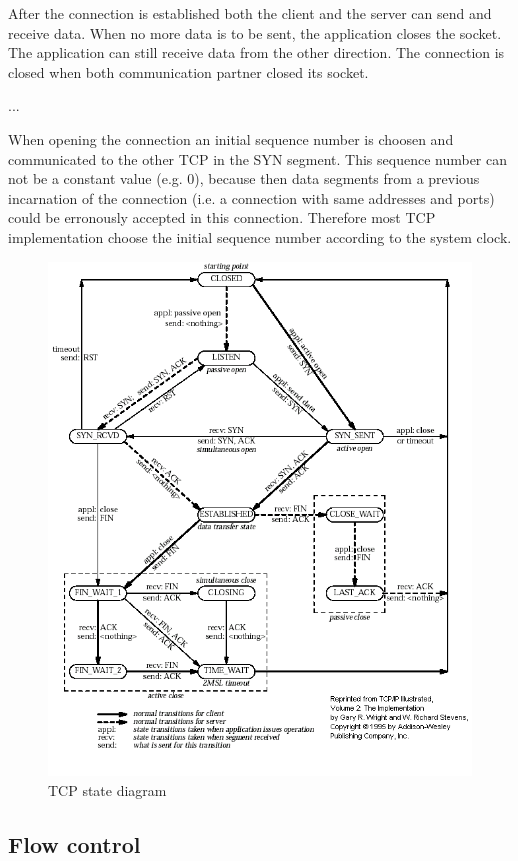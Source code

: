 After the connection is established both the client and the server can send and receive data.
When no more data is to be sent, the application closes the socket. The application can still
receive data from the other direction. The connection is closed when both communication partner
closed its socket.

...

When opening the connection an initial sequence number is choosen and communicated to the
other TCP in the SYN segment. This sequence number can not be a constant value (e.g. 0),
because then data segments from a previous incarnation of the connection (i.e. a connection
with same addresses and ports) could be erronously accepted in this connection. Therefore
most TCP implementation choose the initial sequence number according to the system clock.


\begin{figure}
\includegraphics[width=\textwidth]{figures/tcpstate}
\caption{TCP state diagram}
\label{fig:tcp_states}
\end{figure}

\subsection{Flow control}

